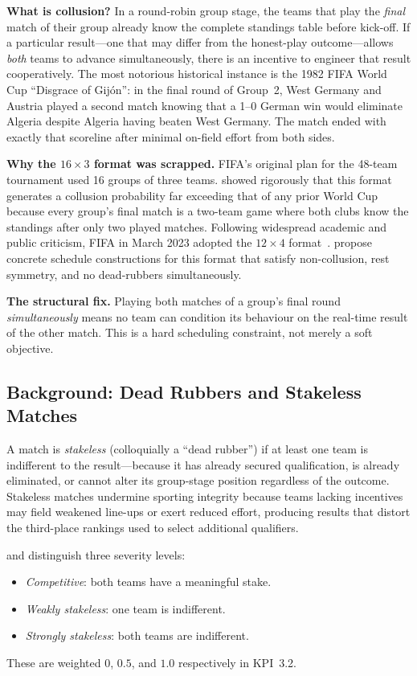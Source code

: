 \documentclass[12pt, letterpaper]{article}
\begin{document}
\textbf{What is collusion?}
In a round-robin group stage, the teams that play the \emph{final} match
of their group already know the complete standings table before kick-off.
If a particular result---one that may differ from the honest-play
outcome---allows \emph{both} teams to advance simultaneously, there is
an incentive to engineer that result cooperatively.  The most notorious
historical instance is the 1982 FIFA World Cup ``Disgrace of
Gij\'{o}n'': in the final round of Group~2, West Germany and Austria
played a second match knowing that a 1--0 German win would eliminate
Algeria despite Algeria having beaten West Germany.  The match ended
with exactly that scoreline after minimal on-field effort from both
sides.

\textbf{Why the $16 \times 3$ format was scrapped.}
FIFA's original plan for the 48-team tournament used 16 groups of three
teams.  \citet{Guyon2020} showed rigorously that this format generates
a collusion probability far exceeding that of any prior World Cup
because every group's final match is a two-team game where both clubs
know the standings after only two played matches.  Following widespread
academic and public criticism, FIFA in March 2023 adopted the
$12 \times 4$ format~\citep{FIFA2023Format}.
\citet{GuajardoKrumer2023, GuajardoKrumer2024} propose concrete schedule
constructions for this format that satisfy non-collusion, rest symmetry,
and no dead-rubbers simultaneously.

\textbf{The structural fix.}
Playing both matches of a group's final round \emph{simultaneously}
means no team can condition its behaviour on the real-time result of
the other match.  This is a hard scheduling constraint, not merely a
soft objective.

\subsection{Background: Dead Rubbers and Stakeless Matches}
\label{sec:deadrubber}

A match is \emph{stakeless} (colloquially a ``dead rubber'') if at
least one team is indifferent to the result---because it has already
secured qualification, is already eliminated, or cannot alter its
group-stage position regardless of the outcome.  Stakeless matches
undermine sporting integrity because teams lacking incentives may field
weakened line-ups or exert reduced effort, producing results that
distort the third-place rankings used to select additional qualifiers.

\citet{CsatoEtAl2024} and \citet{CsatoGyimesi2025} distinguish three
severity levels:
\begin{itemize}[noitemsep, topsep=4pt]
  \item \emph{Competitive}: both teams have a meaningful stake.
  \item \emph{Weakly stakeless}: one team is indifferent.
  \item \emph{Strongly stakeless}: both teams are indifferent.
\end{itemize}
These are weighted $0$, $0.5$, and $1.0$ respectively in KPI~3.2.
\end{document}
